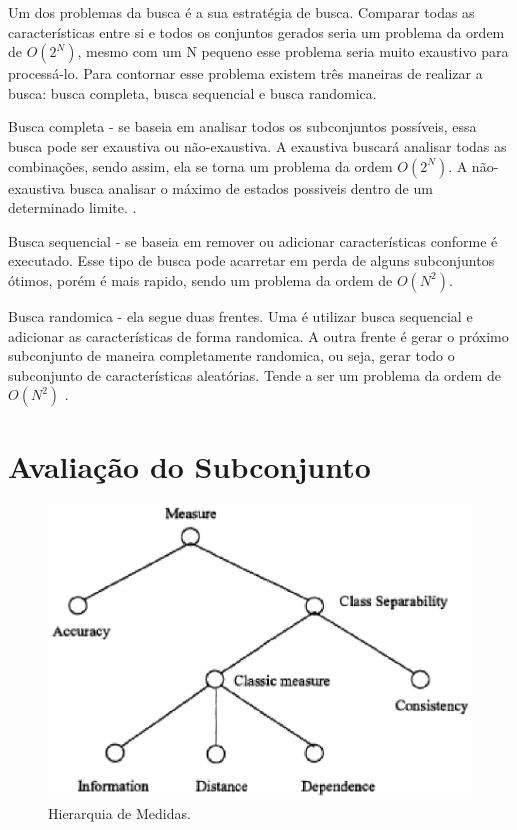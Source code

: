 Um dos problemas da busca é a sua estratégia de busca. Comparar todas as características entre si e todos os conjuntos gerados seria um problema da ordem de $O(2^N)$, mesmo com um N pequeno esse problema seria muito exaustivo para processá-lo. Para contornar esse problema existem três maneiras de realizar a busca: busca completa, busca sequencial e busca randomica.

Busca completa - se baseia em analisar todos os subconjuntos possíveis, essa busca pode ser exaustiva ou não-exaustiva. A exaustiva buscará analisar todas as combinações, sendo assim, ela se torna um problema da ordem $O(2^N)$. A não-exaustiva busca analisar o máximo de estados possiveis dentro de um determinado limite. \cite{liu_2005}. 

Busca sequencial - se baseia em remover ou adicionar características conforme é executado. Esse tipo de busca pode acarretar em perda de alguns subconjuntos ótimos, porém é mais rapido, sendo um problema da ordem de $O(N^2)$. \cite{dash_1997}

Busca randomica - ela segue duas frentes. Uma é utilizar busca sequencial e adicionar as características de forma randomica. A outra frente é gerar o próximo subconjunto de maneira completamente randomica, ou seja, gerar todo o subconjunto de características aleatórias. Tende a ser um problema da ordem de $O(N^2)$ \cite{liu_2005}.

\section{Avaliação do Subconjunto}

\begin{figure}[h]
	\centering
	\label{fig04}
		\includegraphics[keepaspectratio=true,scale=1]{figuras/fig04.eps}
	\caption{Hierarquia de Medidas. \cite{huan_1998}}
\end{figure}

